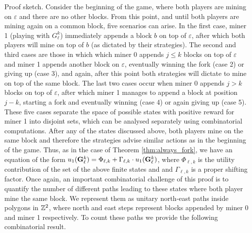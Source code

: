{\sc Proof sketch.} Consider the beginning of the game, where both players are
mining on $\varepsilon$ and there are no other blocks. From this point, and
until both players are mining again on a common block, five scenarios can
arise. In the first case, miner 1 (playing with $G_\ell^k$) immediately appends
a block $b$ on top of $\varepsilon$, after which both players will mine on top
of $b$ (as dictated by their strategies).  The second and third cases are those
in which which miner 0 appends $j\leq k$ blocks on top of $\varepsilon$ and
miner 1 appends another block on $\varepsilon$, eventually winning the fork
(case 2) or giving up (case 3), and again, after this point both strategies
will dictate to mine on top of the same block. The last two cases occur when
miner 0 appends $j>k$ blocks on top of $\varepsilon$, after which miner 1
manages to append a block at position $j-k$, starting a fork and eventually
winning (case 4) or again giving up (case 5).  These five cases separate the space
of possible states with positive reward for miner 1 into disjoint sets, which
can be analysed separately using combinatorial computations. After any of the
states discussed above, both players mine on the same block and therefore the
strategies advise similar actions as in the beginning of the game. 
Thus, as in the case of
Theorem
\ref{thm:always_fork}, we have an equation of the form $u_1({\rm {\bf G}}^k_\ell)  =
\Phi_{\ell, k}+\Gamma_{\ell, k}\cdot u_1({\rm {\bf G}}^k_\ell)$, where $\Phi_{\ell, k}$
is the utility contribution of the set of the above finite states and and
$\Gamma_{\ell, k}$ is a proper shifting factor.  
Once again, an important combinatorial challenge of this proof is to quantify the number of different 
paths leading to these states where both player mine the same block. 
We represent them as 
unitary north-east paths
inside polygons in $\mathbb{Z}^2$, where north and east steps represent blocks
appended by miner 0 and miner 1 respectively.  
To count these paths we provide the following combinatorial result. 
